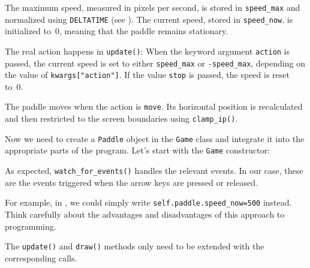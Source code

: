 The maximum speed, measured in pixels per second, is stored in \texttt{speed\_max} and normalized using \texttt{DELTATIME} (see ). The current speed, stored in \texttt{speed\_now}, is initialized to~0, meaning that the paddle remains stationary.

The real action happens in \texttt{update()}: When the keyword argument \texttt{action} is passed, the current speed is set to either \texttt{speed\_max} or \texttt{-speed\_max}, depending on the value of \verb=kwargs["action"]=. If the value \verb=stop= is passed, the speed is reset to~0.

The paddle moves when the action is \texttt{move}. Its horizontal position is recalculated and then restricted to the screen boundaries using \texttt{clamp\_ip()}.


Now we need to create a \texttt{Paddle} object in the \texttt{Game} class and integrate it into the appropriate parts of the program. Let's start with the \texttt{Game} constructor:


As expected, \texttt{watch\_for\_events()} handles the relevant events. In our case, these are the events triggered when the arrow keys are pressed or released.


\begin{hintbox}
	For example, in , we could simply write \texttt{self.paddle.speed\_now=500} instead. Think carefully about the advantages and disadvantages of this approach to programming.
\end{hintbox}

The \texttt{update()} and \texttt{draw()} methods only need to be extended with the corresponding calls.


